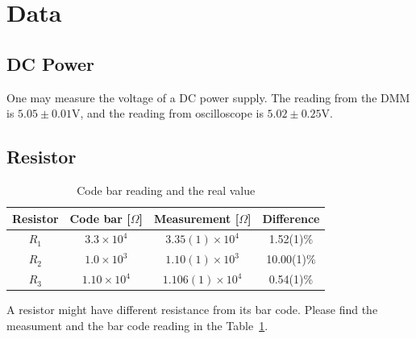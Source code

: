 \documentclass[aps,prl,reprint]{revtex4-1}
\begin{document}
\section{Data}
    \subsection{DC Power}
    One may measure the voltage of a DC power supply. The reading from the DMM is $5.05\pm0.01$V, and the reading from oscilloscope is $5.02\pm0.25$V.
    \subsection{Resistor}
    \begin{table}[h]
    \begin{ruledtabular}
    \begin{tabular}{cccc} 
    Resistor & Code bar [$\Omega$] & Measurement [$\Omega$] & Difference \\
    \hline
    \hline
    $R_1$ & $3.3 \times 10^4$ & $3.35(1)\times 10^4$ & 1.52(1)\% \\ 
    \hline
    $R_2$ & $1.0 \times 10^3$ & $1.10(1)\times 10^3$ & 10.00(1)\%\\
    \hline
    $R_3$ & $1.10 \times 10^4$ & $1.106(1)\times 10^4$ & 0.54(1)\%\\
    \end{tabular}
    \end{ruledtabular}
    \caption{Code bar reading and the real value}
    \label{table:2}
    \end{table} 
    A resistor might have different resistance from its bar code. Please find the measument and the bar code reading in the Table~\ref{table:2}.
\end{document}
